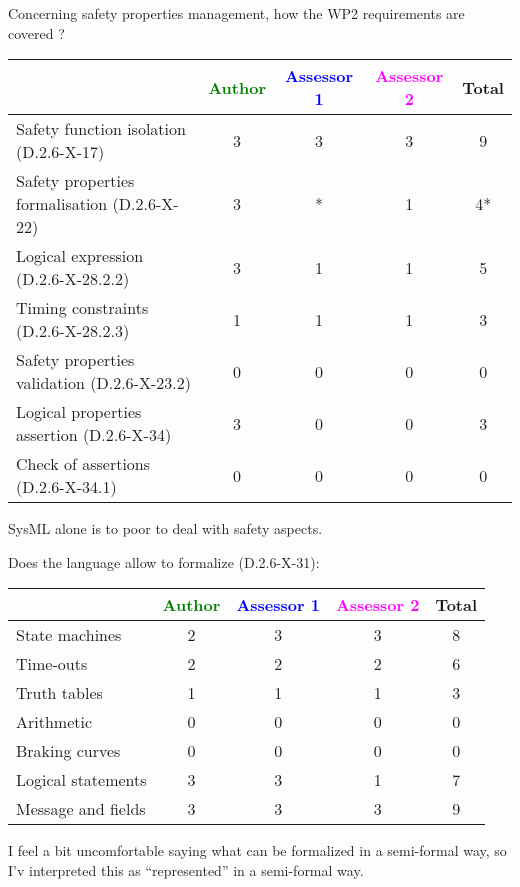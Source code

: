 Concerning safety properties management, how the WP2 requirements are covered ?

\begin{tabular}{|l | c | c | c | c|}
\hline
& \textcolor{green}{Author} & \textcolor{blue}{Assessor 1} & \textcolor{magenta}{Assessor 2} & Total \\
\hline
Safety function isolation (D.2.6-X-17) & 3 & 3 & 3 & 9 \\
\hline
Safety properties formalisation (D.2.6-X-22) & 3 & * & 1 & 4* \\
\hline
Logical expression (D.2.6-X-28.2.2) & 3 & 1 & 1 & 5 \\
\hline
Timing constraints (D.2.6-X-28.2.3) & 1 & 1 & 1 & 3 \\
\hline
Safety properties validation (D.2.6-X-23.2) & 0 & 0 & 0 & 0 \\
\hline
Logical properties assertion (D.2.6-X-34) & 3 & 0 & 0 & 3 \\
\hline
Check of assertions (D.2.6-X-34.1) & 0 & 0 &  0 & 0 \\
\hline
\end{tabular}




\begin{assessor2}
SysML alone is to  poor to deal with safety aspects.
\end{assessor2}


Does the language allow to formalize (D.2.6-X-31):

\begin{tabular}{|l | c | c | c | c|}
\hline
& \textcolor{green}{Author} & \textcolor{blue}{Assessor 1} & \textcolor{magenta}{Assessor 2} & Total \\
\hline
State machines & 2 & 3 & 3 & 8 \\
\hline
Time-outs & 2 & 2 & 2 & 6 \\
\hline
Truth tables & 1 & 1 & 1 & 3 \\
\hline
Arithmetic & 0 & 0 & 0 & 0 \\
\hline
Braking curves & 0 & 0 & 0 & 0 \\
\hline
Logical statements & 3 & 3 & 1 & 7 \\
\hline
Message and fields & 3 & 3 & 3 & 9 \\
\hline
\end{tabular}

\begin{assessor1}
I feel a bit uncomfortable saying what can be formalized in a semi-formal way, so I'v interpreted this as "`represented"' in a semi-formal way. 
\end{assessor1}

